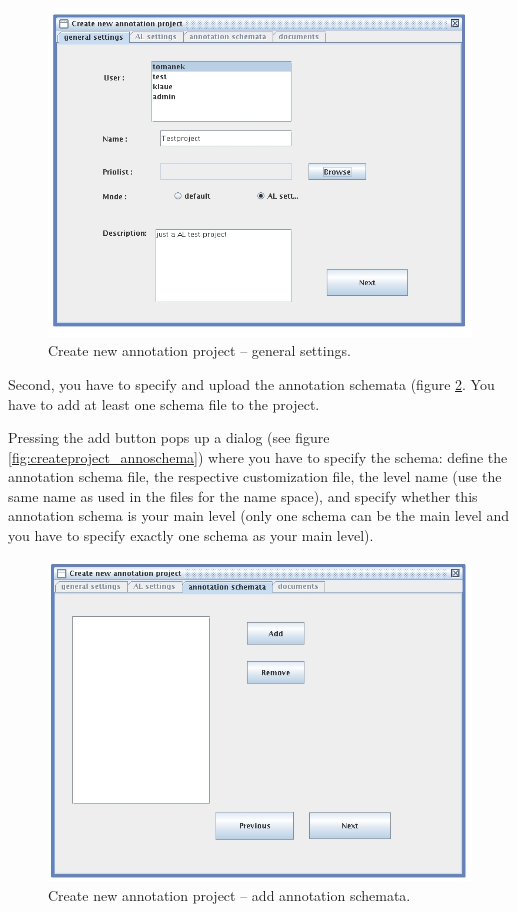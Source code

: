 \documentclass[DIV12,english,11pt,halfparskip]{scrartcl}
\begin{document}
\begin{figure}[h]
  \centering
  \includegraphics[scale=0.5]{figs/CreateProjectGeneralSettings.jpg}
  \caption{Create new annotation project -- general settings.}
  \label{fig:createproject_generalsettings}
\end{figure}

Second, you have to specify and upload the annotation schemata (figure
\ref{fig:createproject_annoschemata}.  You have to add at least one schema
file to the project. 

Pressing the add button pops up a dialog (see figure
\ref{fig:createproject_annoschema}) where you have to specify the
schema: define the annotation schema file, the respective
customization file, the level name (use the same name as used in the
files for the name space), and specify whether this annotation schema
is your main level (only one schema can be the main level and you have
to specify exactly one schema as your main level).


\begin{figure}[h]
  \centering
  \includegraphics[scale=0.5]{figs/CreateProjectAnnotationSchemata.jpg}
  \caption{Create new annotation project -- add annotation schemata.}
  \label{fig:createproject_annoschemata}
\end{figure}
\end{document}
